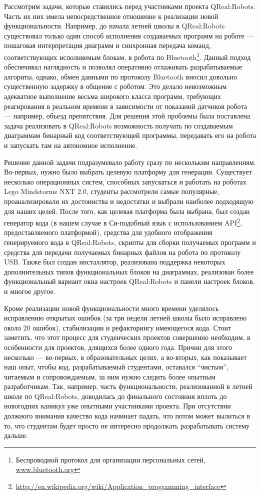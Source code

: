 \documentclass[a4paper]{article}
\begin{document}
Рассмотрим задачи, которые ставились перед участниками проекта QReal:Robots. Часть их них имела непосредственное отношение к реализации новой функциональности. Например, до начала летней школы в QReal:Robots существовал только один способ исполнения создаваемых программ на роботе --- пошаговая интерпретация диаграмм и синхронная передача команд, соответствующих исполняемым блокам, в робота по Bluetooth\footnote{Беспроводной протокол для организации персональных сетей, \url{www.bluetooth.org}}. Данный подход обеспечивал наглядность и позволял оперативно отлаживать разрабатываемые алгориты, однако, обмен данными по протоколу Bluetooth вносил довольно существенную задержку в общение с роботом. Это делало невозможным адекватное выполнение весьма широкого класса программ, требующих реагирования в реальном времени в зависимости от показаний датчиков робота --- например, объезд препятствия. Для решения этой проблемы была поставлена задача реализовать в QReal:Robots возможность получать по создаваемым диаграммам бинарный код соответствующей программы, передавать его на робота и запускать там на автономное исполнение.

Решение данной задачи подразумевало работу сразу по нескольким направлениям. Во-первых, нужно было выбрать целевую платформу для генерации. Существует несколько операционных систем, способных запускаться и работать на роботах Lego Mindstorms NXT 2.0, студенты рассмотрели самые популярные, проанализировали их достоинства и недостатки и выбрали наиболее подходящую для наших целей. После того, как целевая платформа была выбрана, был создан генератор кода (в нашем случае в Си-подобный язык с использованием API\footnote{\url{http://en.wikipedia.org/wiki/Application_programming_interface}}, предоставляемого платформой), средства для удобного отображения генерируемого кода в QReal:Robots, скрипты для сборки получаемых программ и средства для передачи получаемых бинарных файлов на робота по протоколу USB. Также был создан инсталлятор, реализована поддержка некоторых дополнительных типов функциональных блоков на диаграммах, реализован более функциональный вариант окна настроек QReal:Robots и панели настроек блоков,  и многое другое.

Кроме реализации новой функциональности много времени уделялось исправлению открытых ошибок (за три недели летней школы было исправлено около 20 ошибок), стабилизации и рефакторингу имеющегося кода. Стоит заметить, что этот процесс для студенческих проектов совершенно необходим, в особенности для проектов, длящихся более одного года. Причин для этого несколько --- во-первых, в образовательных целях, а во-вторых, как показывает наш опыт, чтобы код, разрабатываемый студентами, оставался ``чистым'', читаемым и сопровождаемым, за ним нужно следить более опытным разработчикам. Так, например, часть функциональности, реализованной в летней школе по QReal:Robots, доводилась до финального состояния вплоть до новогодних каникул уже опытными участниками проекта. При отсутствии должного внимания качество кода начинает падать, что потом может вылиться в то, что студентам будет просто не интересно продолжать разрабатывать систему дальше. 
\end{document}
